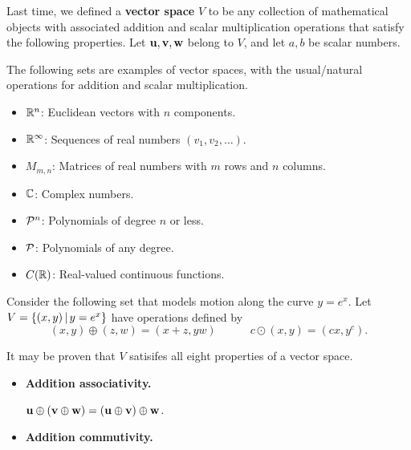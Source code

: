 \begin{applicationActivities}
\begin{remark}
  Last time, we defined a \textbf{vector space} \(V\) to be any collection of
  mathematical objects with
  associated addition and scalar multiplication operations that satisfy
  the following properties. Let \(\vect u,\vect v,\vect w\) belong to \(V\),
  and let \(a,b\) be scalar numbers.

  \vectorSpaceProperties
\end{remark}

\begin{remark}
  The following sets are examples of vector spaces, with the usual/natural
  operations for addition and scalar multiplication.
  \begin{itemize}
    \item \(\IR^n\): Euclidean vectors with \(n\) components.
    \item \(\IR^\infty\): Sequences of real numbers \((v_1,v_2,\dots)\).
    \item \(M_{m,n}\): Matrices of real numbers with \(m\) rows and
          \(n\) columns.
    \item \(\IC\): Complex numbers.
    \item \(\P^n\): Polynomials of degree \(n\) or less.
    \item \(\P\): Polynomials of any degree.
    \item \(C(\IR)\): Real-valued continuous functions.
  \end{itemize}
\end{remark}


\begin{observation}
  Consider the following set that models motion along the curve
  \(y=e^x\). Let \(V=\setBuilder{(x,y)}{y=e^x}\) have operations defined by
  \[
    (x,y)\oplus (z,w)=(x+z,yw)
      \hspace{3em}
    c\odot (x,y)=(cx,y^c)
  .\]

  It may be proven that \(V\) satisifes all eight properties of a vector space.
    \begin{multicols}{2}
    \begin{itemize}
      \item \textbf{Addition associativity.}

            \(\vect u\oplus(\vect v\oplus\vect w)=
            (\vect u\oplus\vect v)\oplus\vect w\).
      \item \textbf{Addition commutivity.}


\end{itemize}
\end{multicols}
\end{observation}
\end{applicationActivities}

